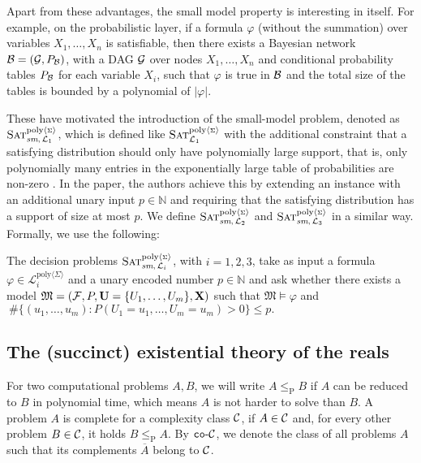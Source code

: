 \documentclass[a4paper,UKenglish,cleveref, autoref, thm-restate]{lipics-v2021}
\newcommand{\IN}{\mathbb{N}}
\newcommand{\leqp}{\leq_{\text{P}}}
\newcommand{\cL}{{\mathcal L}}
\newcommand{\cF}{{\mathcal F}}
\newcommand{\fM}{{\mathfrak M}}
\newcommand{\bU}{{\bf U}}
\newcommand{\bX}{{\bf X}}
\newcommand{\cB}{{\cal B}}
\newcommand{\cC}{{\cal C}}
\newcommand{\cG}{{\cal G}}
\def\probsumname#1#2{^{\text{#1}{\langle{\scriptscriptstyle\Sigma}\rangle}}_{\text{#2}}}
\def\probnamesum#1#2{^{\text{#1}{\langle{\scriptscriptstyle\Sigma}\rangle}}_{\text{#2}}}
\def\Lipolysum{\cL\probnamesum{poly}{$i$}}
\newcommand{\SATprobpolysum}{\mbox{\sc Sat}\probsumname{poly}{${\cal L}_1$}}
\newcommand{\SATprobpolysumsm}{\mbox{\sc Sat}\probsumname{poly}{\textit{sm},\,${\cal L}_1$}}
\newcommand{\SATinterventpolysumsm}{\mbox{\sc Sat}\probsumname{poly}{\textit{sm},\,${\cal L}_2$}}
\newcommand{\SATcausalpolysumsm}{\mbox{\sc Sat}\probsumname{poly}{\textit{sm},\,${\cal L}_3$}}
\newcommand{\SATipolysumsm}{\mbox{\sc Sat}\probsumname{poly}{\textit{sm},\,${\cal L}_i$}}
\begin{document}
Apart from these advantages, the small model property is interesting in itself.
For example, on the probabilistic layer, if a formula $\varphi$ (without the summation)
over variables $X_1,\ldots,X_n$ is satisfiable, then there exists a Bayesian network 
$\cB=(\cG,P_{\cB})$, with a DAG $\cG$ over nodes $X_1,\ldots,X_n$ and 
conditional probability tables $P_{\cB}$ for each variable $X_i$, such that $\varphi$ is true 
in $\cB$ and the total size of the tables is bounded by a polynomial of  $|\varphi|$.


These have motivated the introduction of the small-model problem, denoted as 
$\SATprobpolysumsm$, which is defined like $\SATprobpolysum$ with the additional constraint 
that a satisfying distribution should only have polynomially large support, that is, only polynomially 
many entries in the exponentially large table of probabilities are non-zero \citep{blaser2024existential}.
In the paper, the authors achieve this by extending an instance with an additional unary input $p \in \IN$
and requiring that the satisfying distribution has a support of size at most $p$.
We define $\SATinterventpolysumsm$ and $\SATcausalpolysumsm$ in a similar way.
Formally, we use the following:
\begin{definition}\label{lab:def:small:model:new:U}
	The decision problems $\SATipolysumsm$, with $i=1,2,3$, take as input a formula 
	$\varphi \in \Lipolysum$  
	and a unary encoded number $p \in \IN$
	and ask whether there exists a model  $\fM=(\cF, P, \bU=\{U_1,\ldots,U_m\}, \bX)$ 
	such that $\fM \models\varphi$ and
 	$\ \#\{(u_1,\ldots,u_m): P(U_1=u_1,\ldots, U_m=u_m) > 0\}\le p.$
\end{definition}


\subsection{The (succinct) existential theory of the reals}

For two computational problems $A,B$, we will write $A\leqp B$ if $A$ can be reduced to $B$ in polynomial time, which means $A$ is not harder to solve than $B$. A problem $A$ is complete for a complexity class $\cC$, if $A \in \cC$ and, for every other problem $B\in\cC$, it holds $B\leqp A$. By ${\tt co}\mbox{-}\cC$, we denote the class of all problems
$A$ such that its complements $\overline{A}$ belong to $\cC$.
\end{document}
